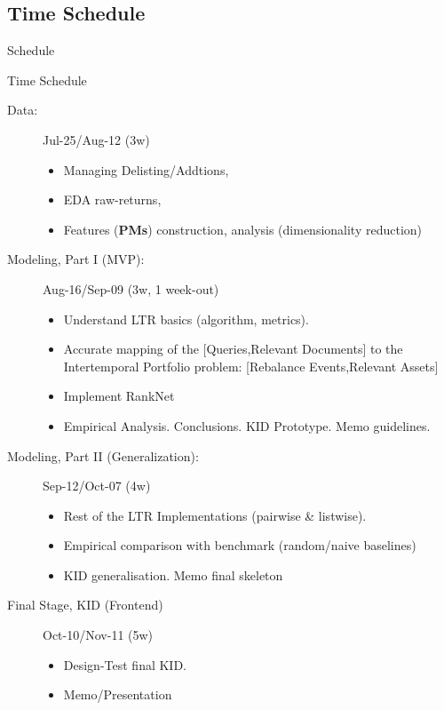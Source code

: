 \documentclass[ucs,8pt,handout]{beamer}
\begin{document}
\subsection{Time Schedule}
\begin{frame}{Schedule}
  \centering
  \begin{block}{Time Schedule}
    \begin{description}
    \item[Data:] Jul-25/Aug-12 (3w)
      \begin{itemize}
      \item Managing Delisting/Addtions,
      \item EDA raw-returns,
      \item Features ({\bf PMs}) construction, analysis
        (dimensionality reduction)
      \end{itemize}
    \item[Modeling, Part I (MVP):] Aug-16/Sep-09 (3w, 1 week-out)
      \begin{itemize}
      \item Understand LTR basics (algorithm, metrics).
      \item Accurate mapping of the [Queries,Relevant Documents] to
        the Intertemporal Portfolio problem: [Rebalance Events,Relevant Assets]
      \item Implement {\sc RankNet}
      \item Empirical Analysis. Conclusions. KID Prototype. Memo guidelines.
      \end{itemize}
      \item[Modeling, Part II (Generalization):] Sep-12/Oct-07 (4w)
        \begin{itemize}
        \item Rest of the LTR Implementations (pairwise \& listwise).
        \item Empirical comparison with benchmark (random/naive
          baselines)
        \item KID generalisation. Memo final skeleton
        \end{itemize}
      \item[Final Stage, KID (Frontend)] Oct-10/Nov-11 (5w)
        \begin{itemize}
        \item Design-Test final KID.
        \item Memo/Presentation
        \end{itemize}

    \end{description}
  \end{block}
\end{frame}
\end{document}
